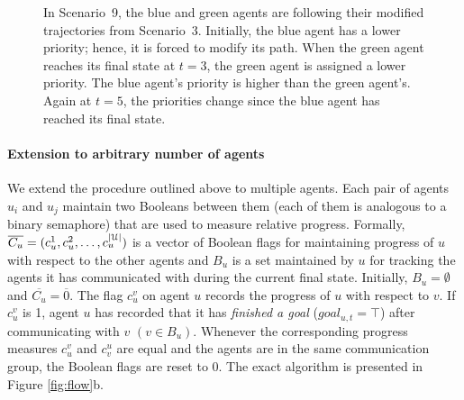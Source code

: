 \begin{eg}
\begin{figure}[htb!]
{}
\caption[Example of dynamic priority allocation to guarantee fairness]{ In Scenario~9, the blue and green agents are following their modified trajectories from Scenario~3. Initially, the blue agent has a lower priority; hence, it is forced to modify its path. When the green agent reaches its final state at $t=3$, the green agent is assigned a lower priority. The blue agent's priority is higher than the green agent's. Again at $t=5$, the priorities change since the blue agent has reached its final state.}
\label{fig:eg6}
\end{figure}
\end{eg}

\paragraph*{Extension to arbitrary number of agents}

We extend the procedure outlined above to multiple agents. Each pair of agents $u_i$ and $u_j$ maintain two Booleans between them (each of them is analogous to a binary semaphore) that are used to measure relative progress. 
Formally, $\overline{C_u} = (c_u^1,c_u^2,\ldots ,c_u^{|\mathcal{U}|})$ is a vector of Boolean flags for maintaining progress of $u$ with respect to the other agents and $B_u$ is a set maintained by $u$ for tracking the agents it has communicated with during the current final state.
Initially, $B_u = \emptyset$ and $\overline{C_u} = \overline{0}$. The flag $c_u^v$ on agent $u$ records the progress of $u$ with respect to $v$. If $c^v_u$ is 1, agent $u$ has recorded that it has \emph{finished a goal} ($goal_{u,t} = \top$) after communicating with $v$ $(v \in B_u)$. Whenever the corresponding progress measures $c_u^v$ and $c_v^u$ are equal and the agents are in the same communication group, the Boolean flags are reset to $0$. The exact algorithm is presented in Figure \ref{fig:flow}b.

